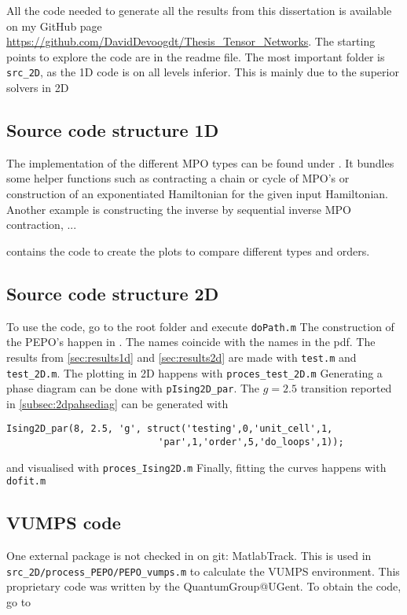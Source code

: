 
All the code needed to generate all the results from this dissertation is available on my GitHub page \url{https://github.com/DavidDevoogdt/Thesis_Tensor_Networks}. The starting points to explore the code are in the readme file. The most important folder is \verb#src_2D#, as the 1D code is on all levels inferior. This is mainly due to the superior solvers in 2D

\subsection{Source code structure 1D}

The implementation of the different MPO types can be found under . It bundles some helper functions such as contracting a chain or cycle of MPO's or construction of an exponentiated Hamiltonian for the given input Hamiltonian. Another example is constructing the inverse by sequential inverse MPO contraction, ...

 contains the code to create the plots to compare different types and orders.

\subsection{Source code structure 2D}

To use the code, go to the root folder and execute  \verb#doPath.m#
The construction of the PEPO's happen in . The names coincide with the names in the pdf.
The results from \cref{sec:results1d} and \cref{sec:results2d} are made with  \verb#test.m# and \verb#test_2D.m#. The plotting in 2D happens with \verb#proces_test_2D.m#
Generating a phase diagram can be done with \verb#pIsing2D_par#. The $g=2.5$ transition reported in \cref{subsec:2dpahsediag} can be generated with
\begin{verbatim}
Ising2D_par(8, 2.5, 'g', struct('testing',0,'unit_cell',1,
                           'par',1,'order',5,'do_loops',1));
\end{verbatim}
and visualised with \verb#proces_Ising2D.m# Finally, fitting the curves happens with \verb#dofit.m#

\subsection{VUMPS code}
One external package is not checked in on git: MatlabTrack. This is used in  \verb#src_2D/process_PEPO/PEPO_vumps.m# to calculate the VUMPS environment. This proprietary code was written by the QuantumGroup@UGent. To obtain the code, go to 
